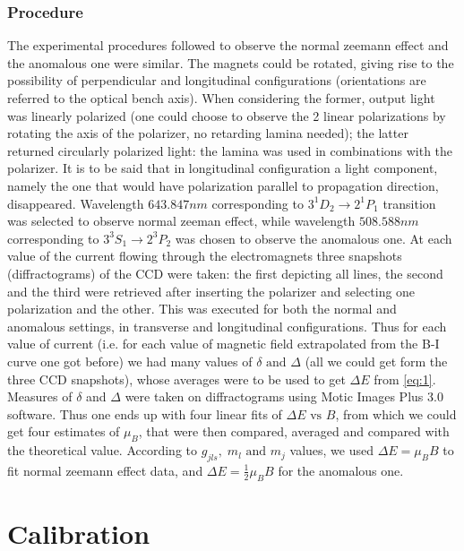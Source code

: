 \documentclass[a4paper,12pt,abstracton]{scrartcl}
\begin{document}
\subsubsection{Procedure} \label{subsec:1}
The experimental procedures followed to observe the normal zeemann effect and the anomalous one were similar. The magnets could be rotated, giving rise to the possibility of perpendicular and longitudinal configurations (orientations are referred to the optical bench axis). When considering the former, output light was linearly polarized (one could choose to observe the 2 linear polarizations by rotating the axis of the polarizer, no retarding lamina needed); the latter returned circularly polarized light: the lamina was used in combinations with the polarizer. It is to be said that in longitudinal configuration a light component, namely the one that would have polarization parallel to propagation direction, disappeared.\newline
Wavelength $643.847 nm$ corresponding to $3 ^{1}D_{2} \longrightarrow 2 ^{1}P_{1}$  transition was selected to observe normal zeeman effect, while wavelength $508.588 nm$ corresponding to $3 ^3S_1 \longrightarrow 2 ^3P_2$ was chosen to observe the anomalous one. \newline
At each value of the current flowing through the electromagnets three snapshots (diffractograms) of the CCD were taken: the first depicting all lines, the second and the third were retrieved after inserting the polarizer and selecting one polarization and the other. This was executed for both the normal and anomalous settings, in transverse and longitudinal configurations.\newline
Thus for each value of current (i.e. for each value of magnetic field extrapolated from the B-I curve one got before) we had many values of $\delta \text{ and } \Delta $ (all we could get form the three CCD snapshots), whose averages were to be used to get $\Delta E$ from \ref{eq:1}. Measures of $\delta$ and $\Delta$ were taken on diffractograms using Motic Images Plus 3.0 software.
Thus one ends up with four linear fits of $\Delta E \text{ vs } B$, from which we could get four estimates of $\mu_B$, that were then compared, averaged and compared with the theoretical value. According to $g_{jls} , \; m_l \text{ and } m_j$ values, we used $\Delta E = \mu_B B$ to fit normal zeemann effect data, and $\Delta E =\frac{1}{2} \mu_B B$ for the anomalous one.
\clearpage
\section{Calibration}\label{sec:cal}
\end{document}
